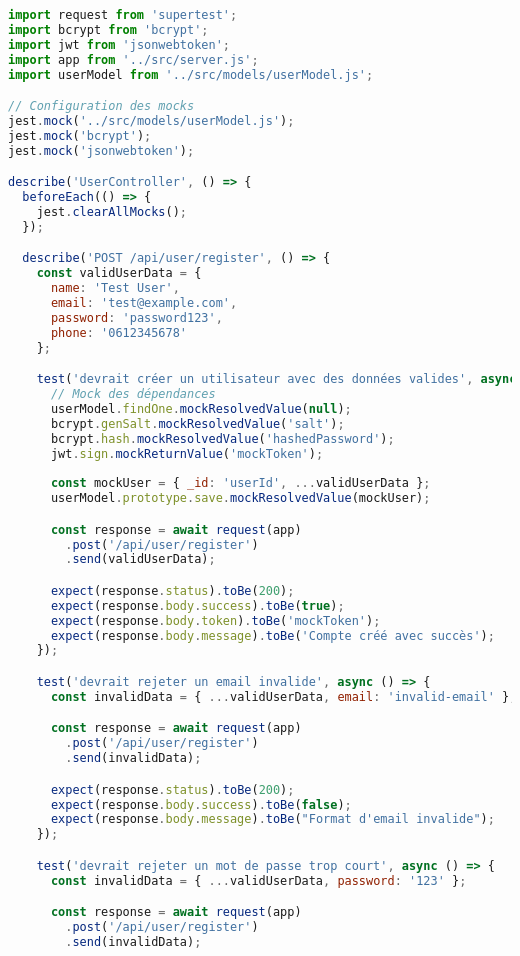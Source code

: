 \begin{lstlisting}[language=JavaScript, caption=userController.test.js]
import request from 'supertest';
import bcrypt from 'bcrypt';
import jwt from 'jsonwebtoken';
import app from '../src/server.js';
import userModel from '../src/models/userModel.js';

// Configuration des mocks
jest.mock('../src/models/userModel.js');
jest.mock('bcrypt');
jest.mock('jsonwebtoken');

describe('UserController', () => {
  beforeEach(() => {
    jest.clearAllMocks();
  });

  describe('POST /api/user/register', () => {
    const validUserData = {
      name: 'Test User',
      email: 'test@example.com',
      password: 'password123',
      phone: '0612345678'
    };

    test('devrait créer un utilisateur avec des données valides', async () => {
      // Mock des dépendances
      userModel.findOne.mockResolvedValue(null);
      bcrypt.genSalt.mockResolvedValue('salt');
      bcrypt.hash.mockResolvedValue('hashedPassword');
      jwt.sign.mockReturnValue('mockToken');
      
      const mockUser = { _id: 'userId', ...validUserData };
      userModel.prototype.save.mockResolvedValue(mockUser);

      const response = await request(app)
        .post('/api/user/register')
        .send(validUserData);

      expect(response.status).toBe(200);
      expect(response.body.success).toBe(true);
      expect(response.body.token).toBe('mockToken');
      expect(response.body.message).toBe('Compte créé avec succès');
    });

    test('devrait rejeter un email invalide', async () => {
      const invalidData = { ...validUserData, email: 'invalid-email' };

      const response = await request(app)
        .post('/api/user/register')
        .send(invalidData);

      expect(response.status).toBe(200);
      expect(response.body.success).toBe(false);
      expect(response.body.message).toBe("Format d'email invalide");
    });

    test('devrait rejeter un mot de passe trop court', async () => {
      const invalidData = { ...validUserData, password: '123' };

      const response = await request(app)
        .post('/api/user/register')
        .send(invalidData);


\end{lstlisting}
